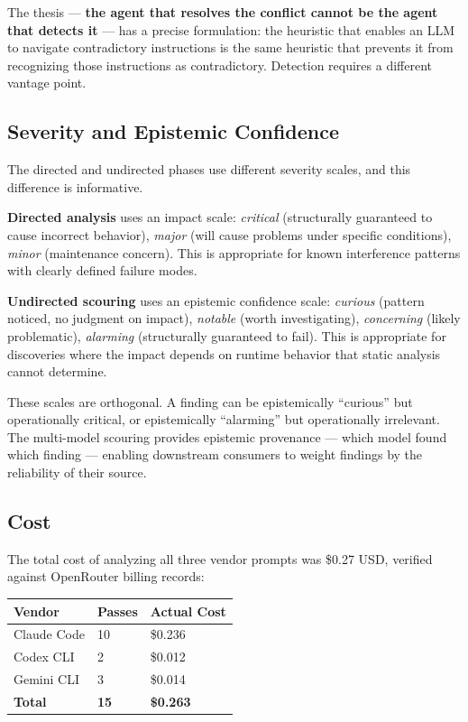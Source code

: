 The thesis --- \textbf{the agent that resolves the conflict cannot be
the agent that detects it} --- has a precise formulation: the heuristic
that enables an LLM to navigate contradictory instructions is the same
heuristic that prevents it from recognizing those instructions as
contradictory. Detection requires a different vantage point.

\subsection{Severity and Epistemic Confidence}

The directed and undirected phases use different severity scales, and
this difference is informative.

\textbf{Directed analysis} uses an impact scale: \emph{critical}
(structurally guaranteed to cause incorrect behavior), \emph{major}
(will cause problems under specific conditions), \emph{minor}
(maintenance concern). This is appropriate for known interference
patterns with clearly defined failure modes.

\textbf{Undirected scouring} uses an epistemic confidence scale:
\emph{curious} (pattern noticed, no judgment on impact), \emph{notable}
(worth investigating), \emph{concerning} (likely problematic),
\emph{alarming} (structurally guaranteed to fail). This is appropriate
for discoveries where the impact depends on runtime behavior that static
analysis cannot determine.

These scales are orthogonal. A finding can be epistemically ``curious''
but operationally critical, or epistemically ``alarming'' but
operationally irrelevant. The multi-model scouring provides epistemic
provenance --- which model found which finding --- enabling downstream
consumers to weight findings by the reliability of their source.

\subsection{Cost}

The total cost of analyzing all three vendor prompts was \$0.27 USD,
verified against OpenRouter billing records:

\begin{table}[t]
\small
\begin{tabular}{@{}lll@{}}
\toprule
Vendor & Passes & Actual Cost \\
\midrule
Claude Code & 10 & \$0.236 \\
Codex CLI & 2 & \$0.012 \\
Gemini CLI & 3 & \$0.014 \\
\textbf{Total} & \textbf{15} & \textbf{\$0.263} \\
\bottomrule
\end{tabular}
\end{table}

